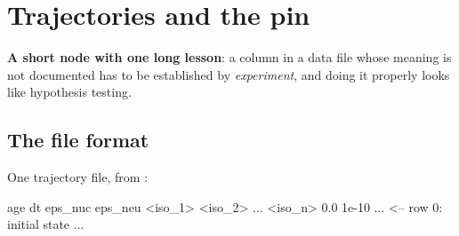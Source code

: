 %
%

\section{Trajectories and the \texorpdfstring{}{eps\_nuc} pin}
\label{part:trajectories}

\textbf{A short node with one long lesson}: a column in a data file whose
meaning is not documented has to be established by \emph{experiment}, and doing
it properly looks like hypothesis testing.

\subsection{The file format}
\label{sec:fileformat}

One trajectory file, from :

\begin{srclisting}
age  dt  eps_nuc  eps_neu  <iso_1> <iso_2> ... <iso_n>
0.0  1e-10  ...                                      <-- row 0: initial state
...
\end{srclisting}

